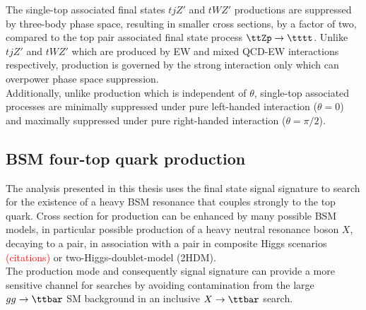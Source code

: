 \documentclass[../thesis.tex]{subfiles}
\begin{document}
The single-top associated final states $tjZ'$ and $tWZ'$ productions are suppressed by three-body phase space, resulting in smaller cross sections, by a factor of two, compared to the top pair associated final state process $\ttZp\rightarrow\tttt$. Unlike $tjZ'$ and $tWZ'$ which are produced by \acs{EW} and mixed \acs{QCD}-\acs{EW} interactions respectively, \tttt production is governed by the strong interaction only which can overpower phase space suppression.\\
Additionally, unlike \tttt production which is independent of $\theta$, single-top associated processes are minimally suppressed under pure left-handed interaction ($\theta=0$) and maximally suppressed under pure right-handed interaction ($\theta=\pi/2$).




\subsection{\acs{BSM} four-top quark production}
\label{sec:4top}
The analysis presented in this thesis uses the \tttt final state signal signature to search for the existence of a heavy \acs{BSM} resonance that couples strongly to the top quark.
Cross section for \tttt production can be enhanced by many possible \acs{BSM} models, in particular possible production of a heavy neutral resonance boson $X$, decaying to a \ttbar pair, in association with a \ttbar pair in composite Higgs scenarios \textcolor{red}{(citations)} or two-Higgs-doublet-model (\acs{2HDM}).\\
The \ttX production mode and consequently \tttt signal signature can provide a more sensitive channel for searches by avoiding contamination from the large $gg\rightarrow \ttbar$ \acs{SM} background in an inclusive $X\rightarrow\ttbar$ search.
\end{document}
